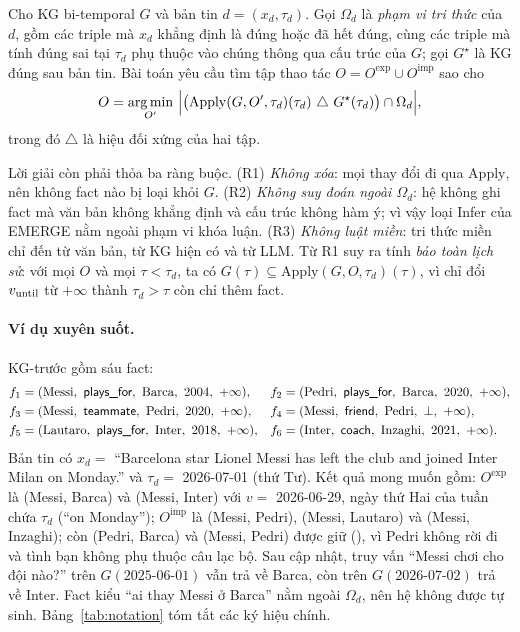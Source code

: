 \begin{defn}\label{def:problem}
Cho KG bi-temporal $G$ và bản tin $d=(x_d,\tau_d)$.
Gọi $\Omega_d$ là \emph{phạm vi tri thức} của $d$, gồm các triple mà $x_d$ khẳng định là đúng hoặc đã hết đúng, cùng các triple mà tính đúng sai tại $\tau_d$ phụ thuộc vào chúng thông qua cấu trúc của $G$; gọi $G^\star$ là KG đúng sau bản tin.
Bài toán yêu cầu tìm tập thao tác $O=O^{\mathrm{exp}}\cup O^{\mathrm{imp}}$ sao cho
\begin{equation}\label{eq:objective}
O=\operatorname*{arg\,min}_{O'}\ \Bigl|\bigl(\mathrm{Apply}(G,O',\tau_d)(\tau_d)\ \triangle\ G^\star(\tau_d)\bigr)\cap\Omega_d\Bigr|,
\end{equation}
trong đó $\triangle$ là hiệu đối xứng của hai tập.
\end{defn}

Lời giải còn phải thỏa ba ràng buộc.
(R1) \emph{Không xóa}: mọi thay đổi đi qua $\mathrm{Apply}$, nên không fact nào bị loại khỏi $G$.
(R2) \emph{Không suy đoán ngoài $\Omega_d$}: hệ không ghi fact mà văn bản không khẳng định và cấu trúc không hàm ý; vì vậy loại Infer của EMERGE nằm ngoài phạm vi khóa luận.
(R3) \emph{Không luật miền}: tri thức miền chỉ đến từ văn bản, từ KG hiện có và từ LLM.
Từ R1 suy ra tính \emph{bảo toàn lịch sử}: với mọi $O$ và mọi $\tau<\tau_d$, ta có $G(\tau)\subseteq\mathrm{Apply}(G,O,\tau_d)(\tau)$, vì  chỉ đổi $v_{\mathrm{until}}$ từ $+\infty$ thành $\tau_d>\tau$ còn  chỉ thêm fact.

\paragraph*{Ví dụ xuyên suốt.}
KG-trước gồm sáu fact:
\begin{align*}
f_1 &= (\text{Messi},\ \kgr{plays\_for},\ \text{Barca},\ 2004,\ +\infty), &
f_2 &= (\text{Pedri},\ \kgr{plays\_for},\ \text{Barca},\ 2020,\ +\infty),\\
f_3 &= (\text{Messi},\ \kgr{teammate},\ \text{Pedri},\ 2020,\ +\infty), &
f_4 &= (\text{Messi},\ \kgr{friend},\ \text{Pedri},\ \bot,\ +\infty),\\
f_5 &= (\text{Lautaro},\ \kgr{plays\_for},\ \text{Inter},\ 2018,\ +\infty), &
f_6 &= (\text{Inter},\ \kgr{coach},\ \text{Inzaghi},\ 2021,\ +\infty).
\end{align*}
Bản tin có $x_d=$ ``Barcelona star Lionel Messi has left the club and joined Inter Milan on Monday.'' và $\tau_d=$ 2026-07-01 (thứ Tư).
Kết quả mong muốn gồm:
$O^{\mathrm{exp}}$ là  (Messi, Barca) và  (Messi, Inter) với $v=$ 2026-06-29, ngày thứ Hai của tuần chứa $\tau_d$ (``on Monday'');
$O^{\mathrm{imp}}$ là  (Messi, Pedri),  (Messi, Lautaro) và  (Messi, Inzaghi);
còn (Pedri, Barca) và (Messi, Pedri) được giữ (), vì Pedri không rời đi và tình bạn không phụ thuộc câu lạc bộ.
Sau cập nhật, truy vấn ``Messi chơi cho đội nào?'' trên $G(\text{2025-06-01})$ vẫn trả về Barca, còn trên $G(\text{2026-07-02})$ trả về Inter.
Fact kiểu ``ai thay Messi ở Barca'' nằm ngoài $\Omega_d$, nên hệ không được tự sinh.
Bảng~\ref{tab:notation} tóm tắt các ký hiệu chính.

